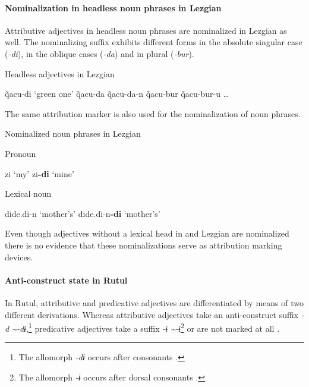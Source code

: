 \paragraph*{Nominalization in headless noun phrases in Lezgian}
Attributive adjectives in headless noun phrases are nominalized in Lezgian as well. The nominalizing suffix exhibits different forms in the absolute singular case (\textit{-di}), in the oblique cases (\textit{-da}) and in plural (\textit{-bur}).
\begin{exe}
\settowidth{}
\ex \rm{Headless adjectives in Lezgian \citep[110]{haspelmath1993}}
\begin{xlist}
\ex	q̃acu-di		\rm{‘green one’}	
\ex	q̃acu-da						
\ex	q̃acu-da-n						
\ex	q̃acu-bur						
\ex	q̃acu-bur-u					
\ex \dots
\end{xlist}
\end{exe}
The same attribution marker is also used for the nominalization of noun phrases.
\begin{exe}
\settowidth{}
\ex \rm{Nominalized noun phrases in Lezgian \citep[110]{haspelmath1993}}
\begin{xlist}
\ex \rm{Pronoun} 
\begin{xlist}
\ex	zi			\rm{‘my’}		
\ex	zi\textbf{-di}	\rm{‘mine’}	
\end{xlist}
\ex \rm{Lexical noun}
\begin{xlist}
\ex	dide.di-n			\rm{‘mother's’}	
\ex 	dide.di-n\textbf{-di}	\rm{‘mother's’}	
\end{xlist}
\end{xlist}
\end{exe}
Even though adjectives without a lexical head in  and Lezgian are nominalized there is no evidence that these nominalizations serve as attribution marking devices.

\paragraph*{Anti\hyp{}construct state in Rutul}
In Rutul, attributive and predicative adjectives are differentiated by means of two different derivations. Whereas attributive adjectives take an anti\hyp{}construct suffix \textit{-d \textasciitilde-dɨ},\footnote{The allomorph \textit{-dɨ} occurs after consonants \citep[224]{alekseev1994a}.} predicative adjectives take a suffix \textit{-ɨ \textasciitilde-ɨ}\footnote{The allomorph \textit{-ɨ} occurs after dorsal consonants \citep[224]{alekseev1994a}.} or are not marked at all \citep[224]{alekseev1994a}.

